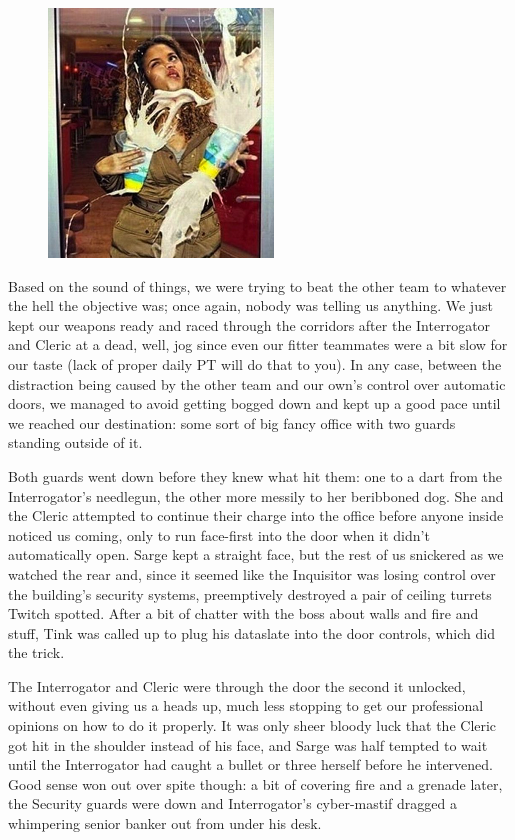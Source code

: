\begin{figure}
	\begin{center}
		\includegraphics[width=\figwidth]{pics/18/28.png}
	\end{center}
\end{figure}
Based on the sound of things, we were trying to beat the other team to whatever the hell the objective was; 
once again, nobody was telling us anything. 
We just kept our weapons ready and raced through the corridors after the Interrogator and Cleric at a dead, well, jog since even our fitter teammates were a bit slow for our taste (lack of proper daily PT will do that to you). 
In any case, between the distraction being caused by the other team and our own's control over automatic doors, we managed to avoid getting bogged down and kept up a good pace until we reached our destination: 
some sort of big fancy office with two guards standing outside of it.

Both guards went down before they knew what hit them: 
one to a dart from the Interrogator's needlegun, the other more messily to her beribboned dog. 
She and the Cleric attempted to continue their charge into the office before anyone inside noticed us coming, only to run face-first into the door when it didn't automatically open. 
Sarge kept a straight face, but the rest of us snickered as we watched the rear and, since it seemed like the Inquisitor was losing control over the building's security systems, preemptively destroyed a pair of ceiling turrets Twitch spotted. 
After a bit of chatter with the boss about walls and fire and stuff, Tink was called up to plug his dataslate into the door controls, which did the trick.

The Interrogator and Cleric were through the door the second it unlocked, without even giving us a heads up, much less stopping to get our professional opinions on how to do it properly. 
It was only sheer bloody luck that the Cleric got hit in the shoulder instead of his face, and Sarge was half tempted to wait until the Interrogator had caught a bullet or three herself before he intervened. 
Good sense won out over spite though: 
a bit of covering fire and a grenade later, the Security guards were down and Interrogator's cyber-mastif dragged a whimpering senior banker out from under his desk.


